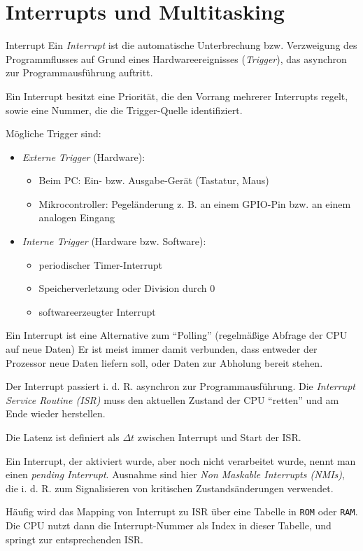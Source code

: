 \section{Interrupts und Multitasking}

\begin{defi}{Interrupt}
    Ein \emph{Interrupt} ist die automatische Unterbrechung bzw. Verzweigung des Programmflusses auf Grund eines Hardwareereignisses (\emph{Trigger}), das asynchron zur Programmausführung auftritt.

    Ein Interrupt besitzt eine Priorität, die den Vorrang mehrerer Interrupts regelt, sowie eine Nummer, die die Trigger-Quelle identifiziert.

    Mögliche Trigger sind:
    \begin{itemize}
        \item \emph{Externe Trigger} (Hardware):
              \begin{itemize}
                  \item Beim PC: Ein- bzw. Ausgabe-Gerät (Tastatur, Maus)
                  \item Mikrocontroller: Pegeländerung z. B. an einem GPIO-Pin bzw. an einem analogen Eingang
              \end{itemize}
        \item \emph{Interne Trigger} (Hardware bzw. Software):
              \begin{itemize}
                  \item periodischer Timer-Interrupt
                  \item Speicherverletzung oder Division durch 0
                  \item softwareerzeugter Interrupt
              \end{itemize}
    \end{itemize}

    Ein Interrupt ist eine Alternative zum \enquote{Polling} (regelmäßige Abfrage der CPU auf neue Daten)
    Er ist meist immer damit verbunden, dass entweder der Prozessor neue Daten liefern soll, oder Daten zur Abholung bereit stehen.

    Der Interrupt passiert i. d. R. asynchron zur Programmausführung.
    Die \emph{Interrupt Service Routine (ISR)} muss den aktuellen Zustand der CPU \enquote{retten} und am Ende wieder herstellen.

    Die Latenz ist definiert als $\Delta t$ zwischen Interrupt und Start der ISR.

    Ein Interrupt, der aktiviert wurde, aber noch nicht verarbeitet wurde, nennt man einen \emph{pending Interrupt}.
    Ausnahme sind hier \emph{Non Maskable Interrupts (NMIs)}, die i. d. R. zum Signalisieren von kritischen Zustandsänderungen verwendet.

    Häufig wird das Mapping von Interrupt zu ISR über eine Tabelle in \texttt{ROM} oder \texttt{RAM}.
    Die CPU nutzt dann die Interrupt-Nummer als Index in dieser Tabelle, und springt zur entsprechenden ISR.
\end{defi}

